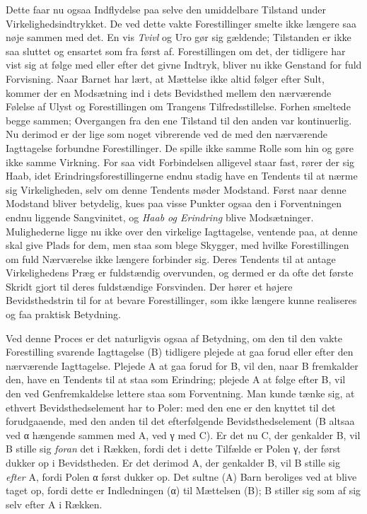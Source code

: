 \documentclass[12pt,a4paper,openany]{book}
\newcommand{\opage}[1]{\marginnote{\footnotesize\textit{[#1]}}}
\begin{document}
Dette faar nu ogsaa Indflydelse paa selve den umiddelbare Tilstand under
Virkelighedsindtrykket. De ved dette vakte Forestillinger smelte ikke
længere saa nøje sammen med det. En vis \emph{Tvivl} og Uro gør sig
gældende; Tilstanden er ikke saa sluttet og ensartet som fra først af.
Forestillingen om det, der tidligere har vist sig at følge med eller
efter det givne Indtryk, bliver nu ikke Genstand for fuld Forvisning.
Naar Barnet har lært, at Mættelse ikke altid følger efter Sult, kommer
der en Modsætning ind i dets Bevidsthed mellem den nærværende Følelse af
Ulyst og Forestillingen om Trangens Tilfredsstillelse. Forhen smeltede
begge sammen; Overgangen fra den ene Tilstand til den anden var
kontinuerlig. Nu derimod er der lige som noget vibrerende ved de med den
nærværende Iagttagelse forbundne Forestillinger. De spille ikke samme
Rolle som hin og gøre ikke samme Virkning. For saa vidt Forbindelsen
alligevel staar fast, rører der sig Haab, idet
Erindringsforestillingerne endnu stadig have en Tendents til at nærme
sig Virkeligheden, selv om denne Tendents møder Modstand. Først naar
denne Modstand bliver betydelig, kues paa visse Punkter ogsaa den i
Forventningen endnu liggende Sangvinitet, og \emph{Haab og Erindring}
blive Modsætninger. Mulighederne ligge nu ikke over den virkelige
Iagttagelse, ventende paa, at denne skal give Plads for dem, men staa
som blege Skygger, med hvilke
\opage{163}Forestillingen om fuld Nærværelse ikke længere forbinder sig.
Deres Tendents til at antage Virkelighedens Præg er fuldstændig
overvunden, og dermed er da ofte det første Skridt gjort til deres
fuldstændige Forsvinden. Der hører et højere Bevidsthedstrin til for at
bevare Forestillinger, som ikke længere kunne realiseres og faa praktisk
Betydning.

Ved denne Proces er det naturligvis ogsaa af Betydning, om den til den
vakte Forestilling svarende Iagttagelse (B) tidligere plejede at gaa
forud eller efter den nærværende Iagttagelse. Plejede A at gaa forud for
B, vil den, naar B fremkalder den, have en Tendents til at staa som
Erindring; plejede A at følge efter B, vil den ved Genfremkaldelse
lettere staa som Forventning. Man kunde tænke sig, at ethvert
Bevidsthedselement har to Poler: med den ene er den knyttet til det
forudgaaende, med den anden til det efterfølgende Bevidsthedselement (B
altsaa ved α hængende sammen med A, ved γ med C). Er det nu C, der
genkalder B, vil B stille sig \emph{foran} det i Rækken, fordi det i
dette Tilfælde er Polen γ, der først dukker op i Bevidstheden. Er det
derimod A, der genkalder B, vil B stille sig \emph{efter} A, fordi Polen
α først dukker op. Det sultne (A) Barn beroliges ved at blive taget op,
fordi dette er Indledningen (α) til Mættelsen (B); B stiller sig som af
sig selv efter A i Rækken.
\end{document}
